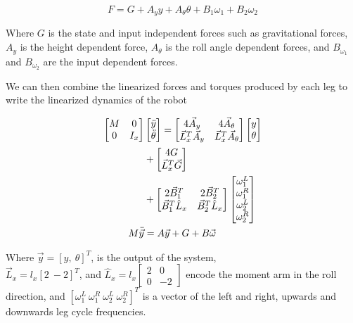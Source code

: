 \begin{equation}
    F = G + A_y y + A_{\theta} \theta + B_1 \omega_1 + B_2 \omega_2
\end{equation}

\noindent Where $G$ is the state and input independent forces such as gravitational forces, $A_y$ is the height dependent force, $A_{\theta}$ is the roll angle dependent forces, and $B_{\omega_1}$ and $B_{\omega_2}$ are the input dependent forces.

We can then combine the linearized forces and torques produced by each leg to write the linearized dynamics of the robot

\begin{align}
    \begin{bmatrix} M & 0 \\
                    0 & I_x \end{bmatrix} 
        &
    \begin{bmatrix} \ddot{y} \\ \ddot{\theta} \end{bmatrix} =
    \begin{bmatrix} 4 \vec{A}_y & 4 \vec{A}_{\theta} \notag \\
                    \vec{L}_x^T \vec{A}_y & \vec{L}_x^T \vec{A}_{\theta} \end{bmatrix}
    \begin{bmatrix} y \\ \theta \end{bmatrix} \notag \\
    & + \begin{bmatrix} 4 G \\ \vec{L}_x^T \vec{G} \end{bmatrix}\\
    & + \begin{bmatrix} 2 \vec{B}_1^T & 2 \vec{B}_2^T \notag \\
                      \vec{B}_1^T \hat{L}_x & \vec{B}_2^T \hat{L}_x \end{bmatrix}
    \begin{bmatrix} \omega_1^L \\ \omega_1^R \\ \omega_2^L \\ \omega_2^R \end{bmatrix} \notag \\
    M \ddot{\vec{y}} &= A \vec{y} + G + B \vec{\omega} \label{eq:rob_dyn}
\end{align}

\noindent Where $\vec{y} = [y, \ \theta]^T$, is the output of the system, \\$\vec{L}_x = l_x [ 2 \ -2 ]^T$, and $\hat{L}_x = l_x \begin{bmatrix} 2 & 0 \\ 0 & -2 \end{bmatrix}$ encode the moment arm in the roll direction, and $[ \omega_1^L \ \omega_1^R \ \omega_2^L \ \omega_2^R ]^T$ is a vector of the left and right, upwards and downwards leg cycle frequencies. 
